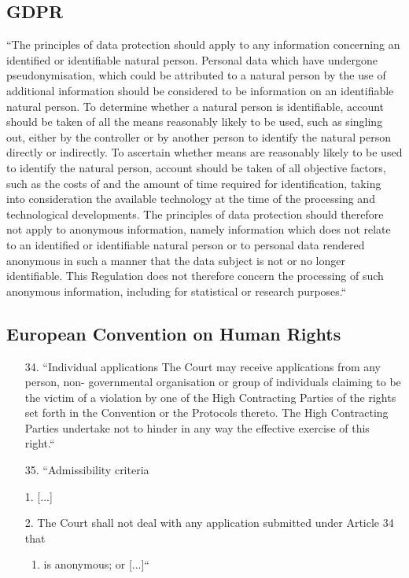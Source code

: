 \documentclass[aps,prb,twocolumn,superscriptaddress,floatfix,longbibliography,nofootinbib]{revtex4-2}
\begin{document}
  \subsection{\label{subsec:GDPR}GDPR}
  ``The principles of data protection should apply to any information concerning an
  identified or identifiable natural person. 
  Personal data which have undergone pseudonymisation, which could be attributed to a natural person by
  the use of additional information should be considered to be information on an identifiable natural person. To
  determine whether a natural person is identifiable, account should be taken of all the means reasonably likely to
  be used, such as singling out, either by the controller or by another person to identify the natural person directly
  or indirectly. To ascertain whether means are reasonably likely to be used to identify the natural person, account
  should be taken of all objective factors, such as the costs of and the amount of time required for identification,
  taking into consideration the available technology at the time of the processing and technological developments.
  The principles of data protection should therefore not apply to anonymous information, namely information
  which does not relate to an identified or identifiable natural person or to personal data rendered anonymous in
  such a manner that the data subject is not or no longer identifiable. This Regulation does not therefore concern
  the processing of such anonymous information, including for statistical or research purposes.`` \cite{GDPR2016}

  \subsection{\label{subsec:ECHR}European Convention on Human Rights}
  \begin{enumerate}
    \item[34.] ``Individual applications
  The Court may receive applications from any person, non-
  governmental organisation or group of individuals claiming to be
  the victim of a violation by one of the High Contracting Parties of
  the rights set forth in the Convention or the Protocols thereto. The
  High Contracting Parties undertake not to hinder in any way the
  effective exercise of this right.``

\item[35.] ``Admissibility criteria
\end{enumerate}
  \begin{enumerate}
    \item[1.] [...]
    \item[2.] The Court shall not deal with any application submitted under Article 34 that
    \begin{enumerate}
      \item is anonymous; or [...]`` \cite{ECHR1950}
    \end{enumerate}
  \end{enumerate}
  \cite{ECHR1950}
\end{document}
